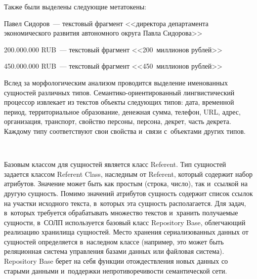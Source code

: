 \begin{multicols}{2}
     Также были выделены сле\-ду\-ющие метатокены:
     
      Павел Сидоров~--- текстовый фрагмент <<директора департамента 
экономического развития автономного округа Павла Сидорова>>
      
      200.000.000 RUB~--- текстовый фрагмент <<200~миллионов рублей>>
      
      450.000.000 RUB~--- текстовый фрагмент <<450~миллионов рублей>>
     
     Вслед за морфологическим анализом проводится выделение 
именованных сущностей различных типов. Се\-ман\-ти\-ко-ори\-ен\-ти\-ро\-ван\-ный 
лингвистический процессор извлекает из текстов 
объекты следующих типов: дата, временной период, территориальное 
образование, денежная сумма, телефон, URL, адрес, организация, транспорт, 
свойство персоны, персона, декрет, часть декрета. Каждому типу 
соответствуют свои свойства и~связи с~объектами других типов. 

\begin{figure*}[b] %
  \vspace*{6pt}
 \begin{center}
 \mbox{%
 \epsfxsize=163mm 
 }
 \end{center}
\vspace*{-9pt}
\end{figure*}
     
     Базовым классом для сущностей является класс Referent. Тип 
сущностей задается классом Referent Class, на\-след\-ным от Referent, который 
содержит набор атрибутов. Значение может быть как прос\-тым (строка, 
число), так и~ссылкой на другую сущ\-ность. Помимо значений атрибутов 
сущность содержит список ссылок на участки исходного текс\-та, в~которых 
эта сущность располагается. Для задач, в~которых требуется обрабатывать 
множество текстов и~хранить по\-лу\-ча\-емые сущности, в~СОЛП используется 
базовый класс Repository Base, об\-лег\-ча\-ющий реализацию хранилища 
сущностей. Мес\-то хранения сериализованных данных от сущностей 
определяется в~наследном классе (например, это может быть реляционная 
система управления базами данных или файловая сис\-те\-ма). 
Repository Base берет на себя функции 
отож\-де\-ст\-вле\-ния новых данных со старыми данными и~поддержки 
не\-про\-ти\-во\-ре\-чи\-вости семантической сети.
     

\end{multicols}
